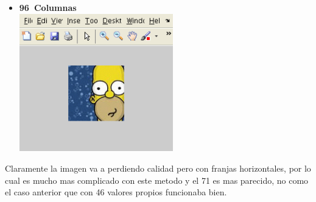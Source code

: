 \begin{itemize}
		\item \textbf{96\ Columnas}\\
			\includegraphics[height=6cm]{img/homeroQR_96} 	
	\end{itemize}

Claramente la imagen va a perdiendo calidad pero con franjas horizontales,
por lo cual es mucho mas complicado con este metodo y el 71 es mas parecido,
no como el caso anterior que con 46 valores propios funcionaba bien.
